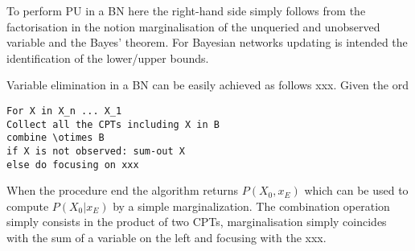 To perform PU in a BN
here the right-hand side simply follows from the factorisation in \cite{x} the notion marginalisation of the unqueried and unobserved variable and the Bayes' theorem. For Bayesian networks updating is intended the identification of the lower/upper bounds.

Variable elimination in a BN can be easily achieved as follows xxx. Given the ord

\begin{verbatim}
For X in X_n ... X_1
Collect all the CPTs including X in B
combine \otimes B
if X is not observed: sum-out X
else do focusing on xxx
\end{verbatim}
When the procedure end the algorithm returns $P(X_0,x_E)$ which can be used to compute $P(X_0|x_E)$ by a simple marginalization. The combination operation simply consists in the product of two CPTs, marginalisation simply coincides with the sum of a variable on the left and focusing with the xxx.
